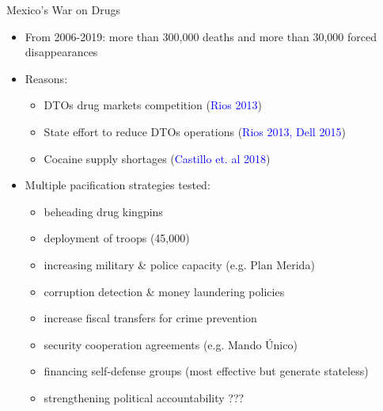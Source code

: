 \documentclass{beamer}
\begin{document}
\begin{frame}[label=war_drugs]{Mexico's War on Drugs}
 
\begin{itemize} 
 		  \setlength\itemsep{0.5em}
  
	\item From 2006-2019: more than 300,000 deaths and more than 30,000 forced disappearances  
	\item Reasons:
		\begin{itemize}
		\item DTOs drug markets competition (\textcolor{blue}{Rios 2013})
		\item State effort to reduce DTOs operations (\textcolor{blue}{Rios 2013, Dell 2015})
		\item Cocaine supply shortages (\textcolor{blue}{Castillo et. al 2018})
		\end{itemize}
\item Multiple pacification strategies tested:
		\begin{itemize}
		\item beheading drug kingpins
		\item deployment of troops (45,000)
		\item increasing military \& police capacity (e.g. Plan Merida)
		\item corruption detection \& money laundering policies
		\item increase fiscal transfers for crime prevention
		\item security cooperation agreements (e.g. Mando \'Unico)
		\item financing self-defense groups (most effective but generate stateless)
		\item \alert{strengthening political accountability ???}
		\end{itemize}
\end{itemize} 
	
\end{frame} 
\end{document}
